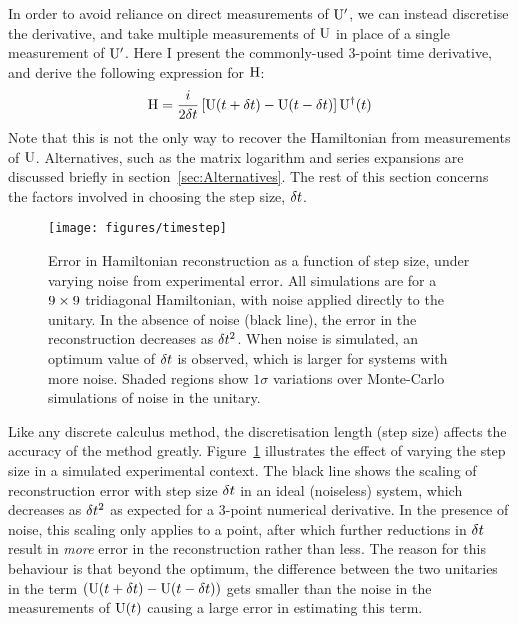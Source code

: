 In order to avoid reliance on direct measurements of \(\mathrm{U}^{\prime}\), we
can instead discretise the derivative, and take multiple measurements of
\(\mathrm{U}\) in place of a single measurement of \(\mathrm{U}^{\prime}\). Here I
present the commonly-used 3-point time derivative, and derive the following
expression for \(\mathrm{H}\):
\begin{equation}
  \label{eq:hamiltomo}
  \mathrm{H} = \frac{i}{2 \delta t} \left[ \mathrm{U} \!\left(t+\delta t\right) - \mathrm{U} \!\left(t-\delta t\right)
  \right] \mathrm{U}^{\dagger} \!\left(t\right)
\end{equation}
Note that this is not the only way to recover the Hamiltonian from measurements
of \(\mathrm{U}\). Alternatives, such as the matrix logarithm and series expansions
are discussed briefly in section~\ref{sec:Alternatives}. The rest of this
section concerns the factors involved in choosing the step size, \(\delta t\).

\begin{figure}[h]
  \centering
  \texttt{[image: figures/timestep]}
  \caption[Error in Hamiltonian reconstruction as a function of step size]
  {Error in Hamiltonian reconstruction as a function of step size, under varying
  noise from experimental error. All simulations are for a \(9 \times 9\)
  tridiagonal Hamiltonian, with noise applied directly to the unitary.
  In the absence of noise (black line), the error in the
  reconstruction decreases as \(\delta t^{2}\). When noise is simulated, an optimum
  value of \(\delta t\) is observed, which is larger for systems with more noise.
  Shaded regions show \(1 \sigma\) variations over Monte-Carlo simulations of
  noise in the unitary.}
  \label{fig:stepsize}
\end{figure}

Like any discrete calculus method, the discretisation length (step size) affects
the accuracy of the method greatly. Figure~\ref{fig:stepsize} illustrates the
effect of varying the step size in a simulated experimental context.
The black line shows the scaling of reconstruction error with step size \(\delta t\)
in an ideal (noiseless) system, which decreases as \(\delta t^{2}\) as expected for
a 3-point numerical derivative. In the presence of noise, this scaling only
applies to a point, after which further reductions in \(\delta t\) result in
\emph{more} error in the reconstruction rather than less. The reason for this
behaviour is that beyond the optimum, the difference between the two unitaries
in the term \(\left( \mathrm{U} \!\left(t+\delta t\right) - \mathrm{U} \!\left(t-\delta t\right) \right)\) gets
smaller than the noise in the measurements of \(\mathrm{U} \!\left(t\right)\) causing a
large error in estimating this term.

